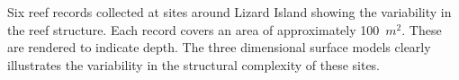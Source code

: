 \label{fig:reef_record_example_bathy}Six reef records collected at sites around Lizard Island showing the variability in the reef structure.  Each record covers an area of approximately 100~$m^2$.  These are rendered to indicate depth. The three dimensional surface models clearly illustrates the variability in the structural complexity of these sites.